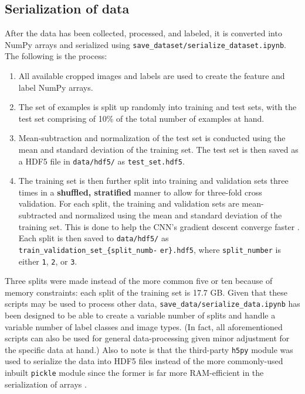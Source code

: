 \documentclass[a4paper, 11pt]{article} %
\begin{document}
	\subsection{Serialization of data}
		After the data has been collected, processed, and labeled, it is 
		converted into NumPy arrays and serialized using 
		\texttt{save\_dataset/serialize\_dataset.ipynb}.
		The following is the process:
		\begin{enumerate}
			\item All available cropped images and labels are used to create 
			the feature and label NumPy arrays.
			\item The set of examples is split up randomly into training 
			and test sets, with the test set comprising of 10\% of the total 
			number of examples at hand.
			\item Mean-subtraction and normalization of the test set is 
			conducted using the mean and standard deviation of the training 
			set. The test set is then saved as a HDF5 file in 
			\texttt{data/hdf5/} as \texttt{test\_set.hdf5}.
			\item The training set is then further split into training and 
			validation sets three times in a \textbf{shuffled, stratified} 
			manner to allow for three-fold cross validation. For each split, 
			the training and validation sets are mean-subtracted and normalized 
			using the mean and standard deviation of the training set. This is 
			done to help the CNN's gradient descent converge faster 
			\cite{sub-norm}\relax. Each split is then saved to
			\texttt{data/hdf5/} as 
			\texttt{train\_validation\_set\_\{split\_numb-} \texttt{er\}.hdf5}, 
			where 
			\texttt{split\_number} is either \texttt{1}, \texttt{2}, or 
			\texttt{3}.
		\end{enumerate}
		Three splits were made instead of the more common five or ten because 
		of memory constraints: each split of the training set is 17.7 GB. Given 
		that these scripts may be used to process other data, 
		\texttt{save\_data/serialize\_data.ipynb} has been designed to be able 
		to create a variable number of splits and handle a variable number of 
		label classes and image types. (In fact, all aforementioned scripts can 
		also 
		be used for general data-processing given minor adjustment for the 
		specific data at hand.) Also to note is that the third-party
		\texttt{h5py} module was used to serialize the data into HDF5 files 
		instead of the more commonly-used inbuilt \texttt{pickle} module since 
		the former is far more RAM-efficient in the serialization of 
		arrays \cite{hdf5-performance}\relax.
\end{document}
